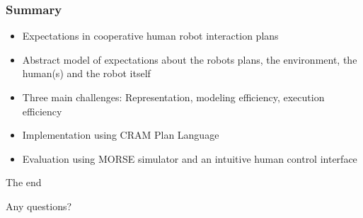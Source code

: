 \documentclass{beamer}
\begin{document}
\begin{frame}
  \frametitle<presentation>{Summary}

  \begin{itemize}
  \item Expectations in cooperative human robot interaction plans
  \item Abstract model of expectations about the robots plans, the environment, the human(s) and the robot itself
  \item Three main challenges: Representation, modeling efficiency, execution efficiency
  \item Implementation using CRAM Plan Language
  \item Evaluation using MORSE simulator and an intuitive human control interface
  \end{itemize}

\end{frame}

\begin{frame}{The end}
 \begin{center}
  Any questions?
\end{center}
\end{frame}
\end{document}
